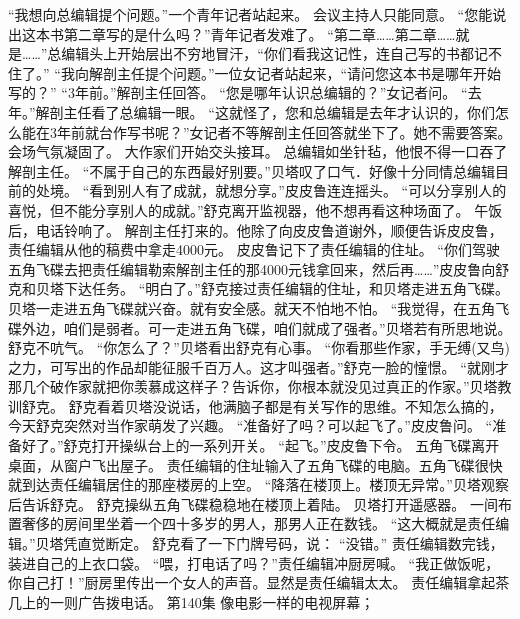\documentclass[a4paper,12pt,UTF8,twoside]{ctexbook}
\begin{document}
        “我想向总编辑提个问题。”一个青年记者站起来。 
        会议主持人只能同意。 
        “您能说出这本书第二章写的是什么吗？”青年记者发难了。 
        “第二章……第二章……就是……”总编辑头上开始层出不穷地冒汗，“你们看我这记性，连自己写的书都记不住了。” 
        “我向解剖主任提个问题。”一位女记者站起来，“请问您这本书是哪年开始写的？” 
        “3年前。”解剖主任回答。 
        “您是哪年认识总编辑的？”女记者问。 
        “去年。”解剖主任看了总编辑一眼。 
        “这就怪了，您和总编辑是去年才认识的，你们怎么能在3年前就台作写书呢？”女记者不等解剖主任回答就坐下了。她不需要答案。 
        会场气氛凝固了。 
        大作家们开始交头接耳。 
        总编辑如坐针毡，他恨不得一口吞了解剖主任。 
        “不属于自己的东西最好别要。”贝塔叹了口气．好像十分同情总编辑目前的处境。 
        “看到别人有了成就，就想分享。”皮皮鲁连连摇头。 
        “可以分享别人的喜悦，但不能分享别人的成就。”舒克离开监视器，他不想再看这种场面了。 
        午饭后，电话铃响了。 
        解剖主任打来的。他除了向皮皮鲁道谢外，顺便告诉皮皮鲁，责任编辑从他的稿费中拿走4000元。 
        皮皮鲁记下了责任编辑的住址。 
        “你们驾驶五角飞碟去把责任编辑勒索解剖主任的那4000元钱拿回来，然后再……”皮皮鲁向舒克和贝塔下达任务。 
        “明白了。”舒克接过责任编辑的住址，和贝塔走进五角飞碟。 
        贝塔一走进五角飞碟就兴奋。就有安全感。就天不怕地不怕。 
        “我觉得，在五角飞碟外边，咱们是弱者。可一走进五角飞碟，咱们就成了强者。”贝塔若有所思地说。 
        舒克不吭气。 
        “你怎么了？”贝塔看出舒克有心事。 
        “你看那些作家，手无缚(又鸟)之力，可写出的作品却能征服千百万人。这才叫强者。”舒克一脸的憧憬。 
        “就刚才那几个破作家就把你羡慕成这样子？告诉你，你根本就没见过真正的作家。”贝塔教训舒克。 
        舒克看着贝塔没说话，他满脑子都是有关写作的思维。不知怎么搞的，今天舒克突然对当作家萌发了兴趣。 
        “准备好了吗？可以起飞了。”皮皮鲁问。 
        “准备好了。”舒克打开操纵台上的一系列开关。 
        “起飞。”皮皮鲁下令。 
        五角飞碟离开桌面，从窗户飞出屋子。 
        责任编辑的住址输入了五角飞碟的电脑。五角飞碟很快就到达责任编辑居住的那座楼房的上空。 
        “降落在楼顶上。楼顶无异常。”贝塔观察后告诉舒克。 
        舒克操纵五角飞碟稳稳地在楼顶上着陆。 
        贝塔打开遥感器。 
        一间布置奢侈的房间里坐着一个四十多岁的男人，那男人正在数钱。 
        “这大概就是责任编辑。”贝塔凭直觉断定。 
        舒克看了一下门牌号码，说：  “没错。” 
        责任编辑数完钱，装进自己的上衣口袋。 
        “喂，打电话了吗？”责任编辑冲厨房喊。 
        “我正做饭呢，你自己打！”厨房里传出一个女人的声音。显然是责任编辑太太。 
        责任编辑拿起茶几上的一则广告拨电话。   第140集 
        像电影一样的电视屏幕； 
\end{document}
